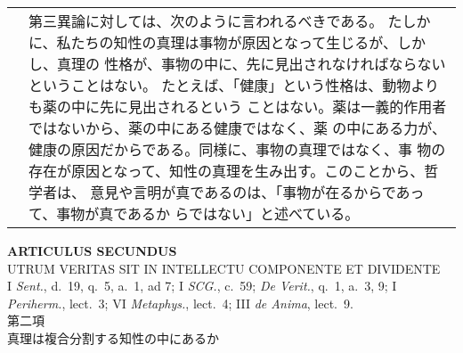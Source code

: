 \documentclass[10pt]{jsarticle} %
\begin{document}
\begin{longtable}{p{21em}p{21em}}
&

第三異論に対しては、次のように言われるべきである。
たしかに、私たちの知性の真理は事物が原因となって生じるが、しかし、真理の
 性格が、事物の中に、先に見出されなければならないということはない。
 たとえば、「健康」という性格は、動物よりも薬の中に先に見出されるという
 ことはない。薬は一義的作用者ではないから、薬の中にある健康ではなく、薬
 の中にある力が、健康の原因だからである。同様に、事物の真理ではなく、事
 物の存在が原因となって、知性の真理を生み出す。このことから、哲学者は、
 意見や言明が真であるのは、「事物が在るからであって、事物が真であるか
 らではない」と述べている。



\end{longtable}
\newpage


\begin{center}
 {\Large {\bf ARTICULUS SECUNDUS}}\\
 {\large UTRUM VERITAS SIT IN INTELLECTU COMPONENTE ET DIVIDENTE}\\
 {\footnotesize I {\itshape Sent.}, d.~19, q.~5, a.~1, ad 7; I {\itshape
 SCG.}, c.~59; {\itshape De Verit.}, q.~1, a.~3, 9; I {\itshape
 Periherm.}, lect.~3; VI {\itshape Metaphys.}, lect.~4; III {\itshape de
 Anima}, lect.~9.}\\
 {\Large 第二項\\真理は複合分割する知性の中にあるか}
\end{center}
\end{document}
